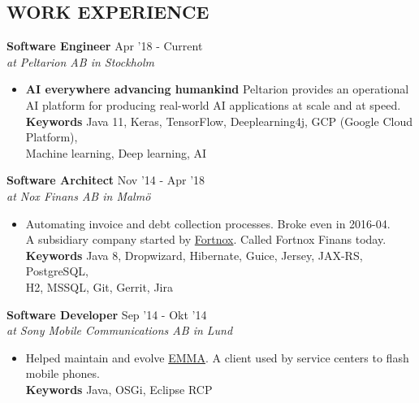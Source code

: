 \documentclass[overlapped]{res}
\begin{document}
 
\begin{resume}
\vspace{1.2cm}
\section{{\sc WORK EXPERIENCE}} 

{\bf Software Engineer} \hfill Apr '18 - Current \\
{\sl at Peltarion AB in Stockholm}
\begin{itemize}
\itemsep -1pt
\item {\bf AI everywhere advancing humankind} Peltarion provides an operational AI platform for producing real-world AI applications at scale and at speed.
\\{\bf Keywords} Java 11, Keras, TensorFlow, Deeplearning4j, GCP (Google Cloud Platform),
\\Machine learning, Deep learning, AI
\end{itemize}

{\bf Software Architect} \hfill Nov '14 - Apr '18 \\
{\sl at Nox Finans AB in Malmö}
\begin{itemize}
\itemsep -1pt
\item Automating invoice and debt collection processes. Broke even in 2016-04. 
\\A subsidiary company started by \href{http://www.fortnox.se/}{Fortnox}. Called Fortnox Finans today.
\\{\bf Keywords} Java 8, Dropwizard, Hibernate, Guice, Jersey, JAX-RS, PostgreSQL,
\\H2, MSSQL, Git, Gerrit, Jira
\end{itemize}

{\bf Software Developer} \hfill Sep '14 - Okt '14 \\
{\sl at Sony Mobile Communications AB in Lund}
\begin{itemize}
\itemsep -1pt
\item Helped maintain and evolve \href{http://emma.extranet.sonyericsson.com/emma/}{EMMA}. A client used by service centers to flash 
\\mobile phones.
\\{\bf Keywords} Java, OSGi, Eclipse RCP 
\end{itemize}


\end{resume}
\end{document}
